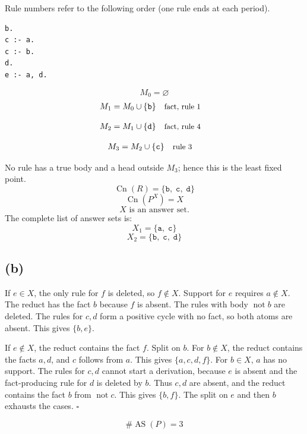 \documentclass[a4paper,11pt]{article}
\newif\ifexplain
\newcommand{\explain}[1]{\ifexplain\begin{erklbox}#1\end{erklbox}\fi}
\newcommand{\why}[1]{\text{\small #1}}
\newcommand{\teil}[1]{\subsection*{(#1)}}
\newcommand{\at}[1]{\texttt{#1}}
\begin{document}
Rule numbers refer to the following order (one rule ends at each period).
\begin{small}
\begin{verbatim}
b.
c :- a.
c :- b.
d.
e :- a, d.
\end{verbatim}
\end{small}
\explain{Beim Redukt bleibt die Kandidatenmenge fest. Wir entscheiden zuerst, welche Regeln wegfallen. Erst danach berechnen wir aus den verbleibenden positiven Regeln die kleinste abgeschlossene Menge. Ein Modell allein reicht nicht: Diese Menge muss genau der Kandidat sein.}
\[
M_0=\varnothing
\]
\begin{align*}
M_{1} &= M_{0}\cup \{\at{b}\} && \why{fact, rule 1}
\end{align*}
\explain{Diese Regel hat keinen Körper. Ihr Kopf $\at{b}$ ist damit ein Fakt und muss in die Menge.}
\begin{align*}
M_{2} &= M_{1}\cup \{\at{d}\} && \why{fact, rule 4}
\end{align*}
\explain{Diese Regel hat keinen Körper. Ihr Kopf $\at{d}$ ist damit ein Fakt und muss in die Menge.}
\begin{align*}
M_{3} &= M_{2}\cup \{\at{c}\} && \why{rule 3}
\end{align*}
\explain{Für $\at{c}$ brauchen wir $\at{b}$. Weil diese Voraussetzungen bereits hergeleitet sind, dürfen wir den Regelkopf jetzt aufnehmen und alle bisherigen Atome behalten; bei einer fehlenden Voraussetzung würde diese Regel dagegen noch nichts beitragen.}
No rule has a true body and a head outside $M_{3}$; hence this is the least fixed point.
\[
\operatorname{Cn}(R)=\{\at{b},\;\at{c},\;\at{d}\}
\]
\[
\operatorname{Cn}(P^X)=X
\]
\[
\boxed{X\text{ is an answer set.}}
\]
The complete list of answer sets is:
\[
\boxed{X_1=\{\at{a},\;\at{c}\}}
\]
\[
\boxed{X_2=\{\at{b},\;\at{c},\;\at{d}\}}
\]
\teil{b}
If $e\in X$, the only rule for $f$ is deleted, so $f\notin X$. Support for $e$ requires $a\notin X$. The reduct has the fact $b$ because $f$ is absent. The rules with body $\mathop{not}b$ are deleted. The rules for $c,d$ form a positive cycle with no fact, so both atoms are absent. This gives $\{b,e\}$.

If $e\notin X$, the reduct contains the fact $f$. Split on $b$. For $b\notin X$, the reduct contains the facts $a,d$, and $c$ follows from $a$. This gives $\{a,c,d,f\}$. For $b\in X$, $a$ has no support. The rules for $c,d$ cannot start a derivation, because $e$ is absent and the fact-producing rule for $d$ is deleted by $b$. Thus $c,d$ are absent, and the reduct contains the fact $b$ from $\mathop{not}c$. This gives $\{b,f\}$. The split on $e$ and then $b$ exhausts the cases. $\square$
\explain{Wir teilen nur nach Atomen auf, die eine echte Entscheidung durch Default-Negation auslösen. Danach erzwingen Fakten und Regeln den Rest. Ein positiver Kreis begründet sich nicht selbst: Ohne Startregel bleibt er beim Aufbau der kleinsten Menge leer.}
\[
\boxed{\#\operatorname{AS}(P)=3}
\]
\end{document}
